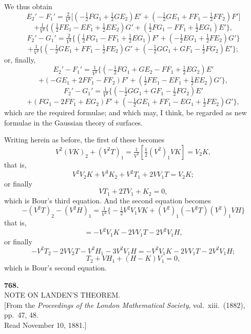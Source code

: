 \documentclass[11pt,a4paper]{article}
\begin{document}
\newpage
\noindent
We thus obtain
\[
  E_{2}'-F_{1}'=\tfrac{2}{V^{2}}\bigl[(-\tfrac{1}{2}FG_{1}+\tfrac{1}{2}GE_{2})E'+(-\tfrac{1}{2}GE_{1}+FF_{1}-\tfrac{1}{2}FF_{2})F'\bigr]
\]
\[
  +\tfrac{1}{V^{2}}\bigl\{(\tfrac{1}{2}FE_{1}-EF_{1}+\tfrac{1}{2}EE_{2})G'+(\tfrac{1}{2}FG_{1}-FF_{1}+\tfrac{1}{2}EG_{1})E'\bigr\},
\]
\[
  F_{2}'-G_{1}'=\tfrac{2}{V^{2}}\bigl\{(\tfrac{1}{2}FG_{1}-FF_{1}+\tfrac{1}{2}EG_{1})F'+(-\tfrac{1}{2}EG_{1}+\tfrac{1}{2}FE_{2})G'\bigr\}
\]
\[
  +\tfrac{1}{V^{2}}\bigl\{(-\tfrac{1}{2}GE_{1}+FF_{1}-\tfrac{1}{2}FE_{2})G'+(-\tfrac{1}{2}GG_{1}+GF_{1}-\tfrac{1}{2}FG_{2})E'\bigr\};
\]
or, finally,
\[
  E_{2}'-F_{1}'=\tfrac{1}{V^{2}}\!\bigl\{(-\tfrac{1}{2}FG_{1}+GE_{2}-FF_{1}+\tfrac{1}{2}EG_{2})E'
\]
\[
  +(-GE_{1}+2FF_{1}-FF_{2})F'+(\tfrac{1}{2}FE_{1}-EF_{1}+\tfrac{1}{2}EE_{2})G'\bigr\},
\]
\[
  F_{2}'-G_{1}'=\tfrac{1}{V^{2}}\!\bigl\{(-\tfrac{1}{2}GG_{1}+GF_{1}-\tfrac{1}{2}FG_{2})E'
\]
\[
  +(FG_{1}-2FF_{1}+EG_{2})F'+(-\tfrac{1}{2}GE_{1}+FF_{1}-EG_{1}+\tfrac{1}{2}FE_{2})G'\bigr\},
\]
which are the required formulae; and which may, I think, be regarded as
new formulae in the Gaussian theory of surfaces.

Writing herein as before, the first of these becomes
\[
  V^{2}(VK)_{2}+(V^{2}T)_{1}=\tfrac{1}{V^{2}}[\tfrac{1}{2}(V^{2})_{1}VK]=V_{2}K,
\]
that is,
\[
  V^{2}V_{2}K+V^{3}K_{2}+V^{2}T_{1}+2VV_{1}T=V_{2}K;
\]
or finally
\[
  VT_{1}+2TV_{1}+K_{2}=0,
\]
which is Bour's third equation. And the second equation becomes
\[
  -(V^{2}T)_{2}-(V^{2}H)_{1}=\tfrac{1}{V^{2}}\bigl\{-\tfrac{1}{2}V^{2}V_{1}VK+(V^{2})_{1}(-V^{2}T)(V^{2})_{1}VH\bigr\}
\]
that is,
\[
  =-V^{2}V_{1}K-2VV_{1}T-2V^{2}V_{1}H,
\]
or finally
\[
  -V^{2}T_{2}-2VV_{2}T-V^{2}H_{1}-3V^{2}V_{1}H=-V^{2}V_{1}K-2VV_{1}T-2V^{2}V_{1}H;
\]
\[
  T_{2}+VH_{1}+(H-K)V_{1}=0,
\]
which is Bour's second equation.

\bigskip


\begin{center}
\textbf{768.}\\[4pt]
\textsc{NOTE ON LANDEN'S THEOREM.}\\[4pt]
[From the \textit{Proceedings of the London Mathematical Society},
vol.\ xiii.\ (1882), pp.\ 47, 48.\\
Read November 10, 1881.]
\end{center}
\end{document}

